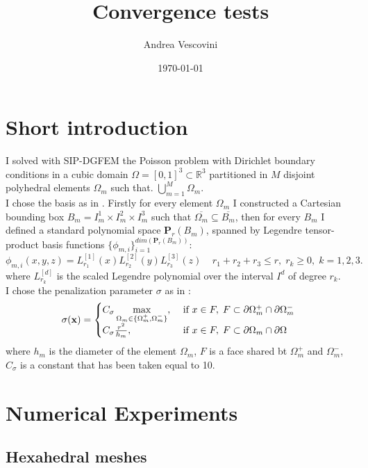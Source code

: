 \documentclass[12pt, a4paper]{article}
\title{\textbf{Convergence tests}}
\author{Andrea Vescovini}
\date{\today}
\begin{document}
	\maketitle
\section{Short introduction}

I solved with SIP-DGFEM the Poisson problem with Dirichlet boundary conditions in a cubic domain $\Omega = [0,1]^{3} \subset \mathbb{R}^{3} $ partitioned in $M$ disjoint polyhedral elements $\Omega_{m}$ such that. $\bigcup\limits_{m=1}^{M} \Omega_{m} $.\\
I chose the basis as in \cite{hpmet}. Firstly for every element $\Omega_m$ I constructed a Cartesian bounding box $B_m = I^1_m \times I^2_m \times I^3_m $ such that $\overline{\Omega_m} \subseteq \overline{B_m}$, then for every $B_m$ I defined a standard polynomial space $\mathbf{P}_r(B_m)$, spanned by Legendre tensor-product basis functions $ \{ \phi_{m,i} \}_{i=1}^{dim(\mathbf{P}_r(B_m))} $:
\begin{equation*}
\phi_{m,i}(x,y,z) = L_{r_1}^{[1]}(x)L_{r_2}^{[2]}(y)L_{r_3}^{[3]}(z) \; \; \; \;
r_1+r_2+r_3 \leq r, \; r_k \geq 0, \; k = 1,2,3.
\end{equation*}
where $L_{r_k}^{[d]} $ is the scaled Legendre polynomial over the interval $ I^d $ of degree $ r_k $.\\
I chose the penalization parameter $\sigma $ as in \cite{multigrid}:
\begin{equation}
\sigma ( \mathbf{x} ) = 
\begin{cases}
C_\sigma \max\limits_{\Omega_m \in \{ \Omega_m^{+}, \Omega_m^{-} \} }, &\text{ if $ x \in F, \; F \subset \partial \Omega_m^{+} \cap \partial \Omega_m^{-} $ }\\
C_\sigma \frac{r^2}{h_m}, &\text{ if $ x \in F, \; F \subset \partial \Omega_m \cap \partial \Omega$}
\end{cases}
\end{equation}
where $h_m$ is the diameter of the element $\Omega_m$, $F$ is a face shared bt $\Omega_m^{+}$ and $\Omega_m^{-}$, $C_{\sigma}$ is a constant that has been taken equal to 10.\\


\newpage
\section{Numerical Experiments}
\subsection{Hexahedral meshes}
\end{document}
